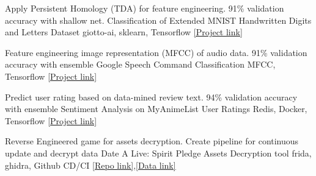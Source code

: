 \begin{cventries}

	\cventry
	{Apply Persistent Homology (TDA) for feature engineering. 91\% validation accuracy with shallow net.}
	{Classification of Extended MNIST Handwritten Digits and Letters Dataset}
	{giotto-ai, sklearn, Tensorflow}
	{\href{https://colab.research.google.com/drive/18z161k3diYO6sNVBfiKH8uGqbrekxMPN?usp=sharing}{[Project link]}}
	{}
	\vspace{-5mm}

	\cventry
	{Feature engineering image representation (MFCC) of audio data. 91\% validation accuracy with ensemble}
	{Google Speech Command Classification}
	{MFCC, Tensorflow}
	{\href{https://colab.research.google.com/drive/1KCJjwgW6VDlANLmXYTotatk2xux3nw0N?usp=sharing}{[Project link]}}
	{}
	\vspace{-5mm}

	\cventry
	{Predict user rating based on data-mined review text. 94\% validation accuracy with ensemble}
	{Sentiment Analysis on MyAnimeList User Ratings}
	{Redis, Docker, Tensorflow}
	{\href{https://github.com/n0k0m3/rnn-mal-sentiment}{[Project link]}}
	{}
	\vspace{-5mm}

	\cventry
	{Reverse Engineered game for assets decryption. Create pipeline for continuous update and decrypt data}
	{Date A Live: Spirit Pledge Assets Decryption tool}
	{frida, ghidra, Github CD/CI}
	{\href{https://github.com/n0k0m3/DALSP-Assets-Decryption-tool}{[Repo link]},\href{https://github.com/n0k0m3/DateALiveData}{[Data link]}}
	{}
	\vspace{-5mm}

\end{cventries}